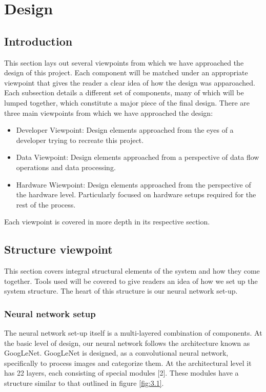 \documentclass{scrreprt}
\begin{document}
\chapter{Design}

\section{Introduction}

This section lays out several viewpoints from which we have approached the design of this project.
Each component will be matched under an appropriate viewpoint that gives the reader a clear idea of how the design was apparoached.
Each subsection details a different set of components, many of which will be lumped together, which constitute a major piece of the final design.
There are three main viewpoints from which we have approached the design:
\begin{itemize}
  \item Developer Viewpoint: Design elements approached from the eyes of a developer trying to recreate this project.

  \item Data Viewpoint: Design elements approached from a perspective of data flow operations and data processing.

  \item Hardware Wiewpoint: Design elements approached from the perspective of the hardware level. Particularly focused on hardware setups required for the rest of the process.
\end{itemize}

Each viewpoint is covered in more depth in its respective section.

\section{Structure viewpoint}%

This section covers integral structural elements of the system and how they come together.
Tools used will be covered to give readers an idea of how we set up the system structure.
The heart of this structure is our neural network set-up.

\subsection{Neural network setup}%

The neural network set-up itself is a multi-layered combination of components.
At the basic level of design, our neural network follows the architecture known as GoogLeNet.
GoogLeNet is designed, as a convolutional neural network, specifically to process images and categorize them.
At the architectural level it has 22 layers, each consisting of special modules [2].
These modules have a structure similar to that outlined in figure \ref{fig:3.1}.
\end{document}
